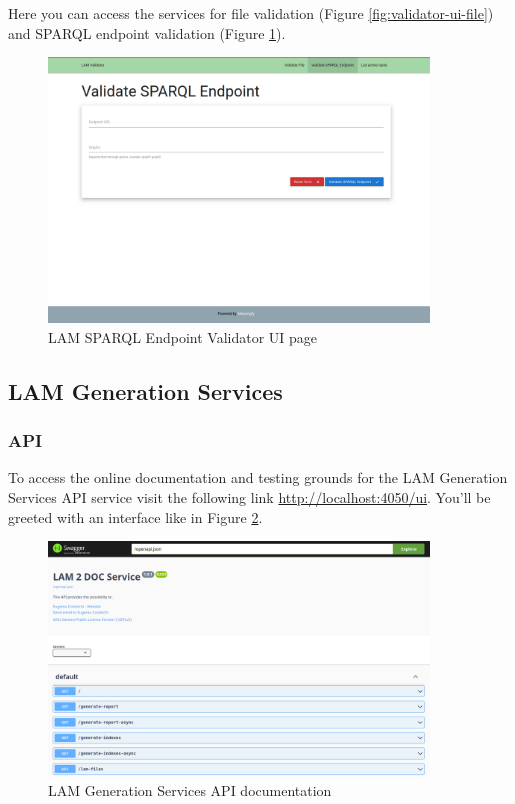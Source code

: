 Here you can access the services for file validation (Figure \ref{fig:validator-ui-file}) and SPARQL endpoint validation (Figure \ref{fig:validator-ui-sparql}).

\begin{figure}[H]
  \centering
  \includegraphics[width=0.9\textwidth]{images/usage/validator-ui-sparql.png}
  \caption{LAM SPARQL Endpoint Validator UI page}
  \label{fig:validator-ui-sparql}
\end{figure} 

\subsection{LAM Generation Services}
\subsubsection{API}
To access the online documentation and testing grounds for the LAM Generation Services API service visit the following link \url{http://localhost:4050/ui}. You'll be greeted with an interface like in Figure \ref{fig:lam-generation-api-documentation}.

\begin{figure}[H]
  \centering
  \includegraphics[width=0.9\textwidth]{images/usage/lam-generation-api.png}
  \caption{LAM Generation Services API documentation}
  \label{fig:lam-generation-api-documentation}
\end{figure} 

